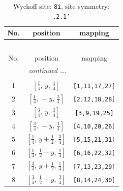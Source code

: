 \documentclass[fleqn,8pt]{jsarticle}
\begin{document}
\begin{longtable}{ccc}
\caption{Wyckoff site: {\tt 8i}, site symmetry: {\tt .2.1'}}
 \\
 \hline \hline
No. & position & mapping \\ \hline \endfirsthead

\multicolumn{2}{l}{\tablename\ \thetable{}} \\
 \hline \hline
No. & position & mapping \\ \hline \endhead

 \hline \hline
\multicolumn{2}{r}{\footnotesize\it continued ...} \\ \endfoot

 \hline \hline
\multicolumn{2}{r}{} \\ \endlastfoot

1 & $\left[ \frac{1}{4},\, y,\, \frac{1}{4} \right]$ & {\tt [1,11,17,27]} \\ \hline
2 & $\left[ \frac{1}{4},\, - y,\, \frac{3}{4} \right]$ & {\tt [2,12,18,28]} \\ \hline
3 & $\left[ \frac{3}{4},\, y,\, \frac{3}{4} \right]$ & {\tt [3,9,19,25]} \\ \hline
4 & $\left[ \frac{3}{4},\, - y,\, \frac{1}{4} \right]$ & {\tt [4,10,20,26]} \\ \hline
5 & $\left[ \frac{1}{4},\, y + \frac{1}{2},\, \frac{3}{4} \right]$ & {\tt [5,15,21,31]} \\ \hline
6 & $\left[ \frac{1}{4},\, \frac{1}{2} - y,\, \frac{1}{4} \right]$ & {\tt [6,16,22,32]} \\ \hline
7 & $\left[ \frac{3}{4},\, y + \frac{1}{2},\, \frac{1}{4} \right]$ & {\tt [7,13,23,29]} \\ \hline
8 & $\left[ \frac{3}{4},\, \frac{1}{2} - y,\, \frac{3}{4} \right]$ & {\tt [8,14,24,30]} \\
\end{longtable}
\renewcommand{\arraystretch}{1.2}
\end{document}
